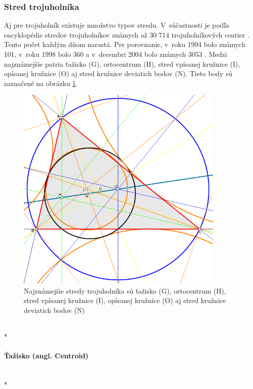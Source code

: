 \subsubsection{Stred trojuholníka}
Aj pre trojuholník existuje množstvo typov stredu. V~súčastnosti je podľa encyklopédie stredov trojuholníkov známych až 30 714 trojuholníkových centier \cite{kimberling_2019}. Tento počet každým dňom narastá. Pre porovnanie, v~roku 1994 bolo známych 101, v~roku 1998 bolo 360 a v~decembri 2004 bolo známych 3053 \cite{Kimberling_Center_2004}. Medzi najznámejšie patria ťažisko (G), ortocentrum (H), stred vpísanej kružnice (I), opísanej kružnice (O) aj stred kružnice deviatich bodov (N). Tieto body sú zaznačené na obrázku \ref{fig:TriangleCenters}.


\begin{figure}[H]
	\centering
	\includegraphics[width=0.9\textwidth]{obrazky-figures/Trigonometric_centres.png}
	\caption{Najznámejšie stredy trojuholníka sú ťažisko (G), ortocentrum (H), stred vpísanej kružnice (I), opísanej kružnice (O) aj stred kružnice deviatich bodov (N) \cite{triangle_center_2012}}
	\label{fig:TriangleCenters}
\end{figure}


 \mbox{} \\*
\paragraph{Ťažisko (angl. Centroid)}\unskip \mbox{} \\*

